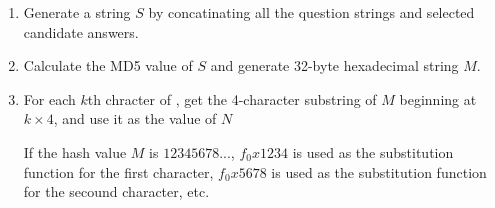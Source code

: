 \documentclass{article}
\begin{document}
\begin{enumerate}
  \item Generate a string $S$ by concatinating all the question strings and selected candidate answers.

  \item Calculate the MD5 value of $S$ and generate 32-byte hexadecimal string $M$.

  \item For each $k$th chracter of {\SS},
    get the 4-character substring of $M$ beginning at $k \times 4$, and use it as the value of $N$

    If the hash value $M$ is $12345678...$,
    $f_0x1234$ is used as the substitution function for the first character,
    $f_0x5678$ is used as the substitution function for the secound character, etc.
\end{enumerate}
\end{document}
